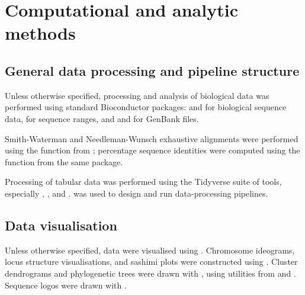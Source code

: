 \newpage
\section{Computational and analytic methods}
\label{sec:methods_comp}

\subsection{General data processing and pipeline structure}
\label{sec:methods_comp_general}

Unless otherwise specified, processing and analysis of biological data was performed using standard Bioconductor \parencite{huber2015bioconductor} packages:  \parencite{pages2017biostrings} and  \parencite{pages2018bsgenome} for biological sequence data,  \parencite{lawrence2013genomicranges} for sequence ranges, and  \parencite{becker2018genbankr} and  \parencite{winter2017rentrez} for GenBank files. 

Smith-Waterman and Needleman-Wunsch exhaustive alignments \parencite{needleman1970alignment,waterman1981alignment} were performed using the  function from ; percentage sequence identities were computed using the  function from the same package.

Processing of tabular data was performed using the Tidyverse suite of tools, especially  \parencite{wickham2018readr},  \parencite{wickham2018dplyr},  \parencite{wickham2018tidyr} and  \parencite{wickham2018stringr}.  \parencite{koster2012snakemake} was used to design and run data-processing pipelines.

\subsection{Data visualisation}
\label{sec:methods_comp_visualisation}

Unless otherwise specified, data were visualised using  \parencite{wickham2016ggplot2}. Chromosome ideograms, locus structure visualisations, and sashimi plots were constructed using  \parencite{hahne2016gviz}. Cluster dendrograms and phylogenetic trees were drawn with  \parencite{guangchuang2018ggtree}, using utilities from  \parencite{paradis2018ape} and  \parencite{guangchuang2018tidytree}. Sequence logos were drawn with  \parencite{wagih2017ggseqlogo}. 

